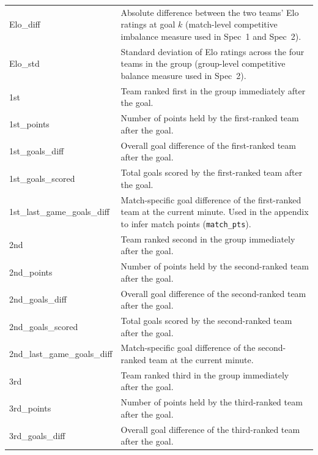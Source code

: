 \documentclass[11pt,a4paper]{article}
\begin{document}
\begin{longtable}{p{4.5cm} p{10.5cm}}
Elo\_diff &
Absolute difference between the two teams' Elo ratings at goal $k$ (match-level competitive imbalance measure used in Spec~1 and Spec~2). \\

Elo\_std &
Standard deviation of Elo ratings across the four teams in the group (group-level competitive balance measure used in Spec~2). \\

1st &
Team ranked first in the group immediately after the goal. \\

1st\_points &
Number of points held by the first-ranked team after the goal. \\

1st\_goals\_diff &
Overall goal difference of the first-ranked team after the goal. \\

1st\_goals\_scored &
Total goals scored by the first-ranked team after the goal. \\

1st\_last\_game\_goals\_diff &
Match-specific goal difference of the first-ranked team at the current minute. Used in the appendix to infer match points (\texttt{match\_pts}). \\

2nd &
Team ranked second in the group immediately after the goal. \\

2nd\_points &
Number of points held by the second-ranked team after the goal. \\

2nd\_goals\_diff &
Overall goal difference of the second-ranked team after the goal. \\

2nd\_goals\_scored &
Total goals scored by the second-ranked team after the goal. \\

2nd\_last\_game\_goals\_diff &
Match-specific goal difference of the second-ranked team at the current minute. \\

3rd &
Team ranked third in the group immediately after the goal. \\

3rd\_points &
Number of points held by the third-ranked team after the goal. \\

3rd\_goals\_diff &
Overall goal difference of the third-ranked team after the goal. \\


\end{longtable}
\end{document}
